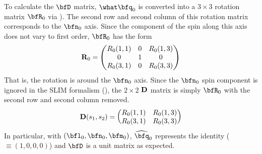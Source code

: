 {To calculate the $\bfD$ matrix, $\what\bfq_0$ is converted into a $3 \times 3$ rotation matrix
$\bfR_0$ via ). The second row and second column of this rotation matrix corresponds to the
$\bfn_0$ axis. Since the component of the spin along this axis does not vary to first order,
$\bfR_0$ has the form
\begin{equation}
  {\bf R}_0 = \begin{pmatrix}
      R_0(1,1) & 0 & R_0(1,3) \\
      0        & 1 & 0        \\
      R_0(3,1) & 0 & R_0(3,3)
  \end{pmatrix}
\end{equation}
That is, the rotation is around the $\bfn_0$ axis. Since the $\bfn_0$ spin component is ignored in
the SLIM formalism (), the $2 \times 2$ ${\bf D}$ matrix is simply $\bfR_0$ with the second
row and second column removed.
\begin{equation}
  {\bf D}(s_1, s_2) = \begin{pmatrix}
      R_0(1,1) & R_0(1,3) \\
      R_0(3,1) & R_0(3,3)
  \end{pmatrix}
\end{equation}
In particular, with $(\bfl_0, \bfn_0, \bfm_0)$, $\widehat \bfq_0$ represents the identity ($\equiv
(1, 0, 0, 0)$) and $\bfD$ is a unit matrix as expected.

}
